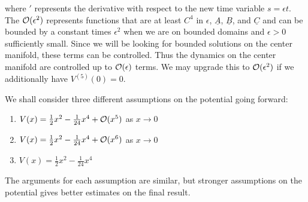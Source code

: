 where \('\) represents the derivative with respect to the new time variable \(s = \epsilon t\). The \(\mathcal{O}(\epsilon^2)\) represents functions that are at least \(C^4\) in \(\epsilon\), \(\underline A\), \(\underline B\), and \(\underline C\) and can be bounded by a constant times \(\epsilon^2\) when we are on bounded domains and \(\epsilon >0\) sufficiently small. Since we will be looking for bounded solutions on the center manifold, these terms can be controlled. Thus the dynamics on the center manifold are controlled up to \(\mathcal{O}(\epsilon)\) terms. We may upgrade this to \(\mathcal{O}(\epsilon^2)\) if we additionally have \(V^{(5)}(0) = 0\).

We shall consider three different assumptions on the potential going forward:
\begin{enumerate}[label = (H\arabic*)]
	\item \(V(x) = \frac 12 x^2 - \frac 1 {24} x^4 + \mathcal{O}(x^5)\) as \(x\to 0\)
	\item \(V(x) = \frac 12 x^2 - \frac 1 {24} x^4 + \mathcal{O}(x ^6)\) as \(x \to 0\)
	\item \(V(x) = \frac 12 x^2 - \frac 1 {24} x^4\)
\end{enumerate}
The arguments for each assumption are similar, but stronger assumptions on the potential gives better estimates on the final result.


